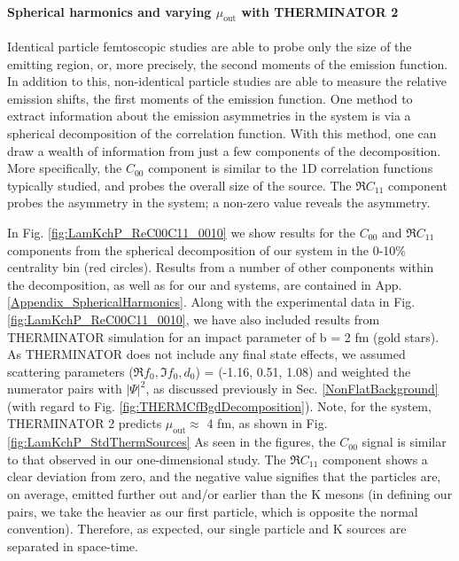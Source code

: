 \documentclass[/home/jesse/Analysis/FemtoAnalysis/AnalysisNotes/AnalysisNoteJBuxton.tex]{subfiles}
\begin{document}
\paragraph*{Spherical harmonics and varying $\mu_{\mathrm{out}}$ with THERMINATOR 2}

Identical particle femtoscopic studies are able to probe only the size of the emitting region, or, more precisely, the second moments of the emission function.
In addition to this, non-identical particle studies are able to measure the relative emission shifts, the first moments of the emission function.
One method to extract information about the emission asymmetries in the system is via a spherical decomposition of the correlation function.
With this method, one can draw a wealth of information from just a few components of the decomposition.
More specifically, the $C_{00}$ component is similar to the 1D correlation functions typically studied, and probes the overall size of the source.
The $\Re C_{11}$ component probes the asymmetry in the system; a non-zero value reveals the asymmetry. 

In Fig. \ref{fig:LamKchP_ReC00C11_0010} we show results for the $C_{00}$ and $\Re C_{11}$ components from the spherical decomposition of our \LamKchP system in the 0-10\% centrality bin (red circles).
Results from a number of other components within the decomposition, as well as for our \LamKs and \LamKchM systems, are contained in App. \ref{Appendix_SphericalHarmonics}.
Along with the experimental data in Fig. \ref{fig:LamKchP_ReC00C11_0010}, we have also included results from THERMINATOR simulation for an impact parameter of b = 2 fm (gold stars).
As THERMINATOR does not include any final state effects, we assumed scattering parameters ($\Re f_{0}, \Im f_{0}, d_{0}$) = (-1.16, 0.51, 1.08) and weighted the numerator pairs with $|\Psi|^{2}$, as discussed previously in Sec. \ref{NonFlatBackground} (with regard to Fig. \ref{fig:THERMCfBgdDecomposition}).
Note, for the \LamKchP system, THERMINATOR 2 predicts $\mu_{\mathrm{out}} \approx$ 4 fm, as shown in Fig. \ref{fig:LamKchP_StdThermSources} 
As seen in the figures, the $C_{00}$ signal is similar to that observed in our one-dimensional study.
The $\Re C_{11}$ component shows a clear deviation from zero, and the negative value signifies that the \Lam particles are, on average, emitted further out and/or earlier than the K mesons (in defining our pairs, we take the heavier \Lam as our first particle, which is opposite the normal convention).
Therefore, as expected, our single particle \Lam and K sources are separated in space-time.
\end{document}
